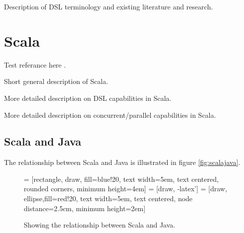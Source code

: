 \documentclass[a4paper,english]{report}
\begin{document}
Description of DSL terminology and existing literature and research.

\chapter{Scala}

Test referance here \cite{hud96}.

Short general description of Scala.

More detailed description on DSL capabilities in Scala.

More detailed description on concurrent/parallel capabilities in Scala.

\section{Scala and Java}

The relationship between Scala and Java is illustrated in figure
\vref{fig:scalajava}.

\begin{figure}
  \begin{center}
   = [rectangle, draw, fill=blue!20, text width=5em, text centered, rounded corners, minimum height=4em]
   = [draw, -latex']
   = [draw, ellipse,fill=red!20, text width=5em, text centered, node distance=2.5cm, minimum height=2em]
  \end{center}
  \caption{Showing the relationship between Scala and
    Java.\label{fig:scalajava}}
\end{figure}
\end{document}
